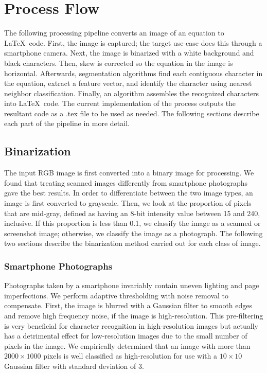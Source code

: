 \documentclass[journal]{IEEEtran}
\begin{document}
\section{Process Flow}
The following processing pipeline converts an image of an equation to \LaTeX\ code. First, the image is captured; the target use-case does this through a smartphone camera. Next, the image is binarized with a white background and black characters. Then, skew is corrected so the equation in the image is horizontal. Afterwards, segmentation algorithms find each contiguous character in the equation, extract a feature vector, and identify the character using nearest neighbor classification. Finally, an algorithm assembles the recognized characters into \LaTeX\ code. The current implementation of the process outputs the resultant code as a .tex file to be used as needed.
The following sections describe each part of the pipeline in more detail.


\subsection{Binarization}
The input RGB image is first converted into a binary image for processing. We found that treating scanned images differently from smartphone photographs gave the best results. In order to differentiate between the two image types, an image is first converted to grayscale. Then, we look at the proportion of pixels that are mid-gray, defined as having an 8-bit intensity value between 15 and 240, inclusive. If this proportion is less than 0.1, we classify the image as a scanned or screenshot image; otherwise, we classify the image as a photograph. The following two sections describe the binarization method carried out for each class of image.

\subsubsection{Smartphone Photographs}
Photographs taken by a smartphone invariably contain uneven lighting and page imperfections. We perform adaptive thresholding with noise removal to compensate. First, the image is blurred with a Gaussian filter to smooth edges and remove high frequency noise, if the image is high-resolution. This pre-filtering is very beneficial for character recognition in high-resolution images but actually has a detrimental effect for low-resolution images due to the small number of pixels in the image. We empirically determined that an image with more than $2000\times1000$ pixels is well classified as high-resolution for use with a $10\times10$ Gaussian filter with standard deviation of $3$.
\end{document}
